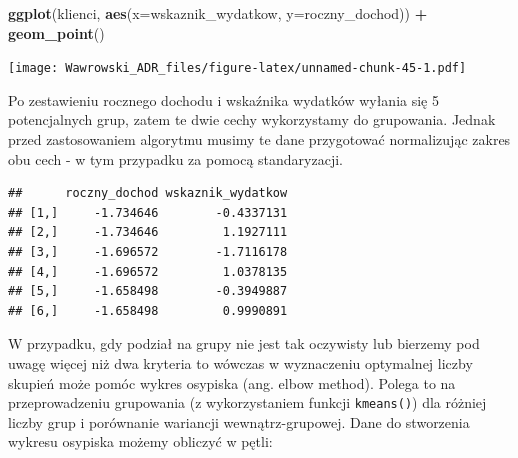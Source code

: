 \documentclass[
]{book}
\newenvironment{Shaded}{\begin{snugshade}}{\end{snugshade}}
\newcommand{\DataTypeTok}[1]{\textcolor[rgb]{0.13,0.29,0.53}{#1}}
\newcommand{\KeywordTok}[1]{\textcolor[rgb]{0.13,0.29,0.53}{\textbf{#1}}}
\newcommand{\NormalTok}[1]{#1}
\newcommand{\OperatorTok}[1]{\textcolor[rgb]{0.81,0.36,0.00}{\textbf{#1}}}
\newcommand{\StringTok}[1]{\textcolor[rgb]{0.31,0.60,0.02}{#1}}
\begin{document}
\begin{Shaded}
\begin{Highlighting}[]
\KeywordTok{ggplot}\NormalTok{(klienci, }\KeywordTok{aes}\NormalTok{(}\DataTypeTok{x=}\NormalTok{wskaznik_wydatkow, }\DataTypeTok{y=}\NormalTok{roczny_dochod)) }\OperatorTok{+}
\StringTok{  }\KeywordTok{geom_point}\NormalTok{()}
\end{Highlighting}
\end{Shaded}

\texttt{[image: Wawrowski\_ADR\_files/figure-latex/unnamed-chunk-45-1.pdf]}

Po zestawieniu rocznego dochodu i wskaźnika wydatków wyłania się 5 potencjalnych grup, zatem te dwie cechy wykorzystamy do grupowania. Jednak przed zastosowaniem algorytmu musimy te dane przygotować normalizując zakres obu cech - w tym przypadku za pomocą standaryzacji.

\begin{Shaded}
\end{Shaded}

\begin{verbatim}
##      roczny_dochod wskaznik_wydatkow
## [1,]     -1.734646        -0.4337131
## [2,]     -1.734646         1.1927111
## [3,]     -1.696572        -1.7116178
## [4,]     -1.696572         1.0378135
## [5,]     -1.658498        -0.3949887
## [6,]     -1.658498         0.9990891
\end{verbatim}

W przypadku, gdy podział na grupy nie jest tak oczywisty lub bierzemy pod uwagę więcej niż dwa kryteria to wówczas w wyznaczeniu optymalnej liczby skupień może pomóc wykres osypiska (ang. elbow method). Polega to na przeprowadzeniu grupowania (z wykorzystaniem funkcji \texttt{kmeans()}) dla różniej liczby grup i porównanie wariancji wewnątrz-grupowej. Dane do stworzenia wykresu osypiska możemy obliczyć w pętli:
\end{document}
